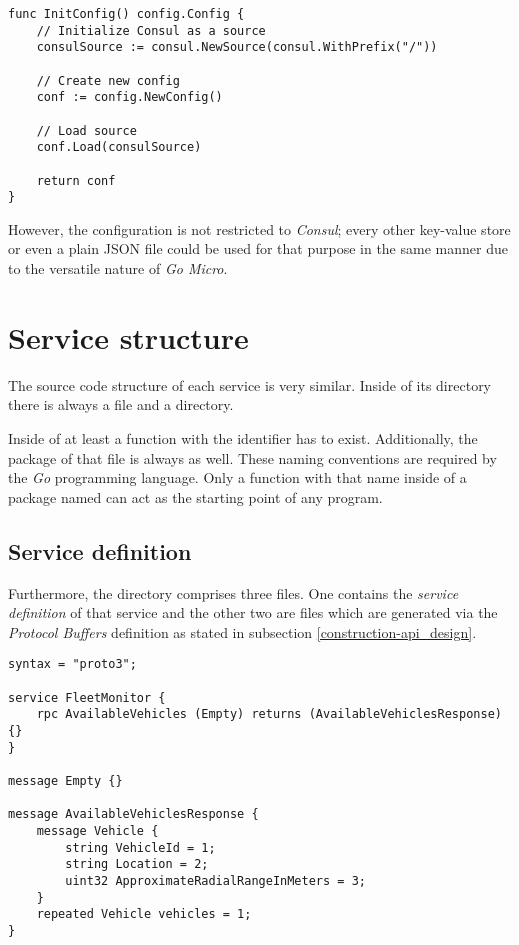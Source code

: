 \documentclass[12pt,a4paper,twoside]{report}
\begin{document}
\begin{lstlisting}[title=common/config.go, float, floatplacement=H]
func InitConfig() config.Config {
	// Initialize Consul as a source
	consulSource := consul.NewSource(consul.WithPrefix("/"))

	// Create new config
	conf := config.NewConfig()

	// Load source
	conf.Load(consulSource)

	return conf
}
\end{lstlisting}

However, the configuration is not restricted to \textit{Consul};
every other key-value store or even a plain JSON file could be used
for that purpose in the same manner due to the versatile nature of \textit{Go Micro}.


\section{Service structure}

The source code structure of each service is very similar.
Inside of its directory there is always a  file and a 
directory.

Inside of  at least a function with the identifier
 has to exist. Additionally, the package of that file is always
 as well. These naming conventions are required by the
\textit{Go} programming language. Only a function with that name inside of
a package named  can act as the starting point of any program.

\subsection{Service definition} \label{subsect:service-definition}
Furthermore, the  directory comprises three files.
One contains the \textit{service definition} of that service and the other
two are  files which are generated via the \textit{Protocol Buffers}
definition as stated in subsection \ref{construction-api_design}.

\begin{lstlisting}[title=services/fleet-monitor/proto/fleet-monitor.proto, language=protobuf3, float, floatplacement=H]
syntax = "proto3";

service FleetMonitor {
    rpc AvailableVehicles (Empty) returns (AvailableVehiclesResponse) {}
}

message Empty {}

message AvailableVehiclesResponse {
    message Vehicle {
        string VehicleId = 1;
        string Location = 2;
        uint32 ApproximateRadialRangeInMeters = 3;
    }
    repeated Vehicle vehicles = 1;
}
\end{lstlisting}
\end{document}
